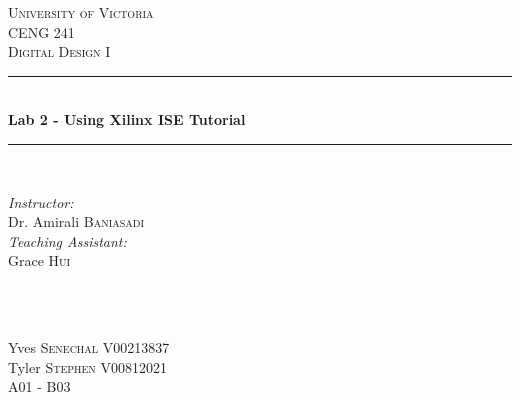 \documentclass[11pt]{article}
\newcommand{\HRule}{\rule{\linewidth}{0.5mm}}
\begin{document}

\begin{titlepage}

\center
 
\textsc{\LARGE University of Victoria}\\[1cm] 	%
\textsc{\Large CENG 241}\\[0.5cm] 			%
\textsc{\large Digital Design I}\\[0.5cm] 		%


\HRule \\[0.4cm]
{\huge \bfseries Lab 2 - Using Xilinx ISE Tutorial}\\[0.2cm] %
\HRule \\[1.5cm]
 
 
\begin{minipage}{0.7\textwidth}
\begin{flushleft} 

\large\emph{Instructor:} \\
Dr. Amirali \textsc{Baniasadi} \\
\vspace{12 pt}
\emph{Teaching Assistant:} \\
Grace \textsc{Hui}

\end{flushleft}
\end{minipage}
~
\begin{minipage}{0.1\textwidth}
\begin{flushright} \large
\vspace{12 pt}
\end{flushright}
\end{minipage}\\[2cm]


\Large Yves \textsc{Senechal}
\large V00213837	\\
\Large Tyler \textsc{Stephen}
\large V00812021	\\
A01 - B03\\[1.5cm] 



\end{titlepage}
\end{document}
